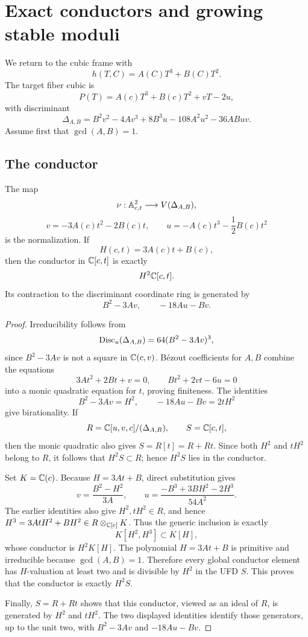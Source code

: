 \section{Exact conductors and growing stable moduli}
\label{app:conductor-arrangements}

We return to the cubic frame with
\[
h(T,C)=A(C)T^3+B(C)T^2.
\]
The target fiber cubic is
\[
P(T)=A(c)T^3+B(c)T^2+vT-2u,
\]
with discriminant
\[
\Delta_{A,B}
=B^2v^2-4Av^3+8B^3u-108A^2u^2-36ABuv.
\]
Assume first that \(\gcd(A,B)=1\).

\subsection{The conductor}

\begin{theorem}
\label{thm:cubic-frame-conductor}
The map
\[
\nu:\mathbb A^2_{c,t}\longrightarrow V(\Delta_{A,B}),
\]
\[
v=-3A(c)t^2-2B(c)t,\qquad
u=-A(c)t^3-\frac12B(c)t^2
\]
is the normalization.  If
\[
H(c,t)=3A(c)t+B(c),
\]
then the conductor in \(\mathbb C[c,t]\) is exactly
\[
H^2\mathbb C[c,t].
\]
Its contraction to the discriminant coordinate ring is generated by
\[
B^2-3Av,\qquad -18Au-Bv.
\]
\end{theorem}

\begin{proof}
Irreducibility follows from
\[
\operatorname{Disc}_u(\Delta_{A,B})=64(B^2-3Av)^3,
\]
since \(B^2-3Av\) is not a square in \(\mathbb C(c,v)\).  B\'ezout coefficients
for \(A,B\) combine the equations
\[
3At^2+2Bt+v=0,\qquad Bt^2+2vt-6u=0
\]
into a monic quadratic equation for \(t\), proving finiteness.  The
identities
\[
B^2-3Av=H^2,\qquad
-18Au-Bv=2tH^2
\]
give birationality.  If
\[
R=\mathbb C[u,v,c]/(\Delta_{A,B}),\qquad S=\mathbb C[c,t],
\]
then the monic quadratic also gives \(S=R[t]=R+Rt\).  Since both
\(H^2\) and \(tH^2\) belong to \(R\), it follows that
\(H^2S\subset R\); hence \(H^2S\) lies in the conductor.

Set \(K=\mathbb C(c)\).  Because \(H=3At+B\), direct substitution gives
\[
v=\frac{B^2-H^2}{3A},\qquad
u=\frac{-B^3+3BH^2-2H^3}{54A^2}.
\]
The earlier identities also give \(H^2,tH^2\in R\), and hence
\(H^3=3AtH^2+BH^2\in R\otimes_{\mathbb C[c]}K\).  Thus the generic inclusion is
exactly
\[
K[H^2,H^3]\subset K[H],
\]
whose conductor is \(H^2K[H]\).  The polynomial \(H=3At+B\) is primitive
and irreducible because \(\gcd(A,B)=1\).  Therefore every global conductor
element has \(H\)-valuation at least two and is divisible by \(H^2\) in the
UFD \(S\).  This proves that the conductor is exactly \(H^2S\).

Finally, \(S=R+Rt\) shows that this conductor, viewed as an ideal of \(R\),
is generated by \(H^2\) and \(tH^2\).  The two displayed identities identify
those generators, up to the unit two, with
\(B^2-3Av\) and \(-18Au-Bv\).
\end{proof}

